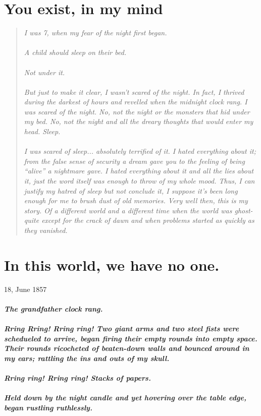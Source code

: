 \documentclass{book}
\begin{document}
\chapter*{You exist, in my mind}
\begin{quote}
    \textit{I was 7, when my fear of the night first began.\\\\
        A child should sleep on their bed.\\\\
        Not under it.\\\\
        But just to make it clear, I wasn't scared of the night. In fact, I thrived during the darkest of hours and revelled when the midnight clock rang.
        I was scared of the night.
        No, not the night or the monsters that hid under my bed.
        No, not the night and all the dreary thoughts that would enter my head.
        Sleep.\\\\
        I was scared of sleep... absolutely terrified of it. I hated everything about it; from the false sense of security a dream gave you
        to the feeling of being ``alive'' a nightmare gave.
        I hated everything about it and all the lies about it, just the word itself was enough to throw of my whole mood.
        Thus, I can justify my hatred of sleep but not conclude it, I suppose it's been long enough for me to brush dust of old memories.
        Very well then, this is my story. Of a different world and a different time when the world was ghost-quite except for the crack of dawn and when problems
        started as quickly as they vanished.}
\end{quote}
\chapter{In this world, we have no one.}
18, June 1857
\paragraph{The grandfather clock rang.\\\\
    Rring Rring! Rring ring!
    Two giant arms and two steel fists were schedueled to arrive,
    began firing their empty rounds into empty space. Their rounds ricocheted of
    beaten-down walls and bounced around in my ears; rattling the ins and outs of
    my skull.\\\\
    Rring ring! Rring ring!
    Stacks of papers.\\\\
    Held down by the night candle and yet hovering over the table edge, began
rustling ruthlessly.}
\end{document}
